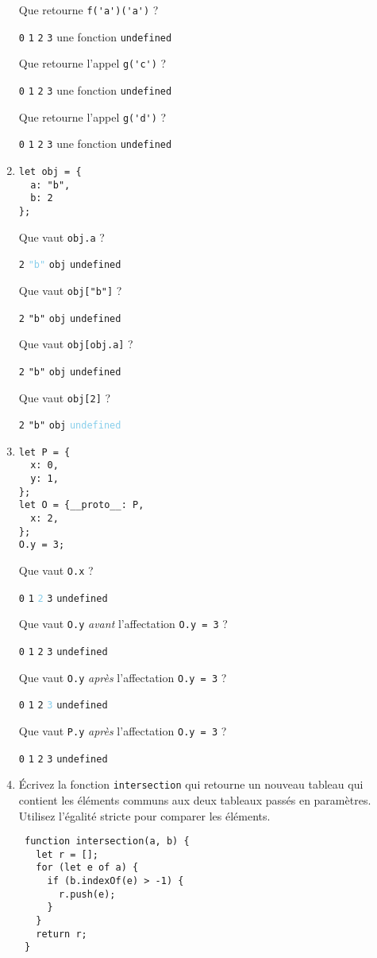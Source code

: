 \documentclass[a4paper, 12pt]{article}
\newcommand{\choice}[1]{\Square\hspace{2pt} #1\hspace{5pt}}
\newcommand{\choicec}[1]{\Square\hspace{2pt} \lstinline{#1}\hspace{5pt}}
\newcommand{\fullpoint}[1]{\textcolor{RubineRed}{#1}}
\newcommand{\halfpoint}[1]{\textcolor{SkyBlue}{#1}}
\newcommand{\choicecg}[1]{\fullpoint{\XBox\hspace{2pt} \lstinline{#1}\hspace{5pt}}}
\newcommand{\choicecgh}[1]{\halfpoint{\XBox\hspace{2pt} \lstinline{#1}\hspace{5pt}}}
\begin{document}
\begin{enumerate}
  Que retourne \lstinline{f('a')('a')} ?

  \choicec{0} \choicec{1} \choicecg{2} \choicec{3} \choice{une fonction} \choicec{undefined}

  Que retourne l'appel \lstinline{g('c')} ?

  \choicec{0} \choicec{1} \choicecg{2} \choicec{3} \choice{une fonction} \choicec{undefined}

  Que retourne l'appel \lstinline{g('d')} ?

  \choicec{0} \choicec{1} \choicec{2} \choicecg{3} \choice{une fonction} \choicec{undefined}
\item \lstset{language=javascript}
\begin{lstlisting}
let obj = {
  a: "b",
  b: 2
};
\end{lstlisting}

  Que vaut \lstinline{obj.a} ?

  \choicec{2} \choicecgh{"b"} \choicec{obj} \choicec{undefined}

  Que vaut \lstinline{obj["b"]} ?

  \choicecg{2} \choicec{"b"} \choicec{obj} \choicec{undefined}

  Que vaut \lstinline{obj[obj.a]} ?

  \choicecg{2} \choicec{"b"} \choicec{obj} \choicec{undefined}

  Que vaut \lstinline{obj[2]} ?

  \choicec{2} \choicec{"b"} \choicec{obj} \choicecgh{undefined}
\item \begin{lstlisting}
let P = {
  x: 0,
  y: 1,
};
let O = {__proto__: P,
  x: 2,
};
O.y = 3;
\end{lstlisting}

  Que vaut \lstinline{O.x} ?

  \choicec{0} \choicec{1} \choicecgh{2} \choicec{3} \choicec{undefined}

  Que vaut \lstinline{O.y} \emph{avant} l'affectation \lstinline{O.y = 3} ?

  \choicec{0} \choicecg{1} \choicec{2} \choicec{3} \choicec{undefined}

  Que vaut \lstinline{O.y} \emph{après} l'affectation \lstinline{O.y = 3} ?

  \choicec{0} \choicec{1} \choicec{2} \choicecgh{3} \choicec{undefined}

  Que vaut \lstinline{P.y} \emph{après} l'affectation \lstinline{O.y = 3} ?

  \choicec{0} \choicecg{1} \choicec{2} \choicec{3} \choicec{undefined}

\newpage
\item Écrivez la fonction \lstinline{intersection} qui retourne un nouveau
  tableau qui contient les éléments communs aux deux tableaux passés en
  paramètres.  Utilisez l'égalité stricte pour comparer les éléments.

\begin{lstlisting}
 function intersection(a, b) {
   let r = [];
   for (let e of a) {
     if (b.indexOf(e) > -1) {
       r.push(e);
     }
   }
   return r;
 }
\end{lstlisting}
\end{enumerate}
\end{document}
